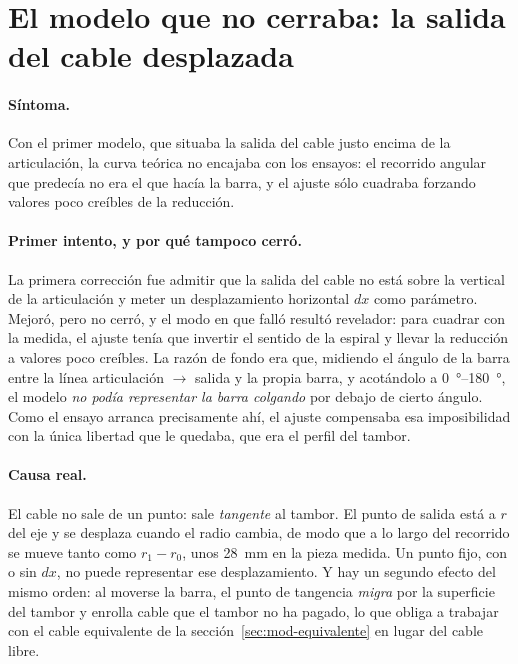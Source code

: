 \section{El modelo que no cerraba: la salida del cable desplazada}
\label{sec:prob-dx}

\paragraph{Síntoma.} Con el primer modelo, que situaba la salida del cable justo encima de la
articulación, la curva teórica no encajaba con los ensayos: el recorrido angular que predecía no era
el que hacía la barra, y el ajuste sólo cuadraba forzando valores poco creíbles de la reducción.

\paragraph{Primer intento, y por qué tampoco cerró.} La primera corrección fue admitir que la salida
del cable no está sobre la vertical de la articulación y meter un desplazamiento horizontal $dx$ como
parámetro. Mejoró, pero no cerró, y el modo en que falló resultó revelador: para cuadrar con la
medida, el ajuste tenía que invertir el sentido de la espiral y llevar la reducción a valores poco
creíbles. La razón de fondo era que, midiendo el ángulo de la barra entre la línea articulación
$\to$ salida y la propia barra, y acotándolo a \SIrange{0}{180}{\degree}, el modelo \emph{no podía
representar la barra colgando} por debajo de cierto ángulo. Como el ensayo arranca precisamente ahí,
el ajuste compensaba esa imposibilidad con la única libertad que le quedaba, que era el perfil del
tambor.

\paragraph{Causa real.} El cable no sale de un punto: sale \emph{tangente} al tambor. El punto de
salida está a $r$ del eje y se desplaza cuando el radio cambia, de modo que a lo largo del recorrido
se mueve tanto como $r_1-r_0$, unos \SI{28}{\milli\metre} en la pieza medida. Un punto fijo, con o
sin $dx$, no puede representar ese desplazamiento. Y hay un segundo efecto del mismo orden: al
moverse la barra, el punto de tangencia \emph{migra} por la superficie del tambor y enrolla cable
que el tambor no ha pagado, lo que obliga a trabajar con el cable equivalente de la
sección~\ref{sec:mod-equivalente} en lugar del cable libre.

